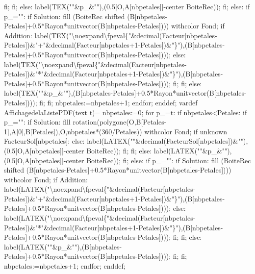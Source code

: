 {  fi;
  fi;
  else:
  label(TEX("\num{"&p_&"}"),(0.5[O,A[nbpetales]]-center BoiteRec));
  fi;
  else:
  if p_="":
  if Solution:
  fill (BoiteRec shifted (B[nbpetales-Petales]+0.5*Rayon*unitvector(B[nbpetales-Petales]))) withcolor Fond;
  if Addition:
  label(TEX("\num{\noexpand\fpeval{"&decimal(Facteur[nbpetales-Petales])&"+"&decimal(Facteur[nbpetales+1-Petales])&"}}"),(B[nbpetales-Petales]+0.5*Rayon*unitvector(B[nbpetales-Petales])));
  else:
  label(TEX("\num{\noexpand\fpeval{"&decimal(Facteur[nbpetales-Petales])&"*"&decimal(Facteur[nbpetales+1-Petales])&"}}"),(B[nbpetales-Petales]+0.5*Rayon*unitvector(B[nbpetales-Petales])));
  fi;
  fi;
  else:
  label(TEX("\num{"&p_&"}"),(B[nbpetales-Petales]+0.5*Rayon*unitvector(B[nbpetales-Petales])));
  fi;
  fi;
  nbpetales:=nbpetales+1;
  endfor;
  enddef;
  vardef AffichagedelaListePDF(text t)=
  nbpetales:=0;
  for p_=t:
  if nbpetales<Petales:
  if p_="":
  if Solution:
  fill rotation(polygone(O,B[Petales-1],A[0],B[Petales]),O,nbpetales*(360/Petales)) withcolor Fond;
  if unknown FacteurSol[nbpetales]:
  else:
  label(LATEX("\num{"&decimal(FacteurSol[nbpetales])&"}"),(0.5[O,A[nbpetales]]-center BoiteRec));
  fi;
  fi;
  else:
  label(LATEX("\num{"&p_&"}"),(0.5[O,A[nbpetales]]-center BoiteRec));
  fi;
  else:
  if p_="":
  if Solution:
  fill (BoiteRec shifted (B[nbpetales-Petales]+0.5*Rayon*unitvector(B[nbpetales-Petales]))) withcolor Fond;
  if Addition:
  label(LATEX("\num{\noexpand\fpeval{"&decimal(Facteur[nbpetales-Petales])&"+"&decimal(Facteur[nbpetales+1-Petales])&"}}"),(B[nbpetales-Petales]+0.5*Rayon*unitvector(B[nbpetales-Petales])));
  else:
  label(LATEX("\num{\noexpand\fpeval{"&decimal(Facteur[nbpetales-Petales])&"*"&decimal(Facteur[nbpetales+1-Petales])&"}}"),(B[nbpetales-Petales]+0.5*Rayon*unitvector(B[nbpetales-Petales])));
  fi;
  fi;
  else:
  label(LATEX("\num{"&p_&"}"),(B[nbpetales-Petales]+0.5*Rayon*unitvector(B[nbpetales-Petales])));
  fi;
  fi;
  nbpetales:=nbpetales+1;
  endfor;
  enddef;
}

